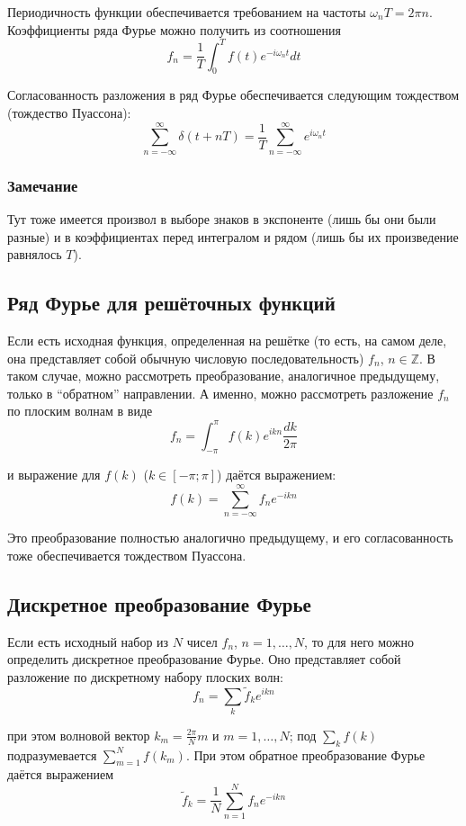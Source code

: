 \documentclass[a4paper,12pt]{article}
\begin{document}
\noindent
Периодичность функции обеспечивается требованием на частоты $\omega_{n}T=2\pi n$.
Коэффициенты ряда Фурье можно получить из соотношения
\[
f_{n}=\frac{1}{T}\int_{0}^{T}f(t)e^{-i\omega_{n}t}dt
\]


\noindent
Согласованность разложения в ряд Фурье обеспечивается следующим тождеством
(тождество Пуассона):
\[
\sum_{n=-\infty}^{\infty}\delta(t+nT)=\frac{1}{T}\sum_{n=-\infty}^{\infty}e^{i\omega_{n}t}
\]



\subsubsection*{Замечание}

Тут тоже имеется произвол в выборе знаков в экспоненте (лишь бы они
были разные) и в коэффициентах перед интегралом и рядом (лишь бы их
произведение равнялось $T$).


\subsection*{Ряд Фурье для решёточных функций}

Если есть исходная функция, определенная на решётке (то есть, на самом
деле, она представляет собой обычную числовую последовательность)
$f_{n}$, $n\in\mathbb{Z}$. В таком случае, можно рассмотреть преобразование,
аналогичное предыдущему, только в ``обратном'' направлении. А именно,
можно рассмотреть разложение $f_{n}$ по плоским волнам в виде
\[
f_{n}=\int_{-\pi}^{\pi}f(k)e^{ikn}\frac{dk}{2\pi}
\]


\noindent
и выражение для $f(k)$ ($k\in\left[-\pi;\pi\right]$) даётся выражением:
\[
f(k)=\sum_{n=-\infty}^{\infty}f_{n}e^{-ikn}
\]


\noindent
Это преобразование полностью аналогично предыдущему, и его согласованность
тоже обеспечивается тождеством Пуассона.


\subsection*{Дискретное преобразование Фурье}

Если есть исходный набор из $N$ чисел $f_{n}$, $n=1,\dots,N$, то
для него можно определить дискретное преобразование Фурье. Оно представляет
собой разложение по дискретному набору плоских волн:
\[
f_{n}=\sum_{k}\tilde{f}_{k}e^{ikn}
\]


\noindent
при этом волновой вектор $k_{m}=\frac{2\pi}{N}m$ и $m=1,\dots,N$;
под $\sum_{k}f\left(k\right)$ подразумевается $\sum_{m=1}^{N}f\left(k_{m}\right)$.
При этом обратное преобразование Фурье даётся выражением
\[
\tilde{f}_{k}=\frac{1}{N}\sum_{n=1}^{N}f_{n}e^{-ikn}
\]
\end{document}
